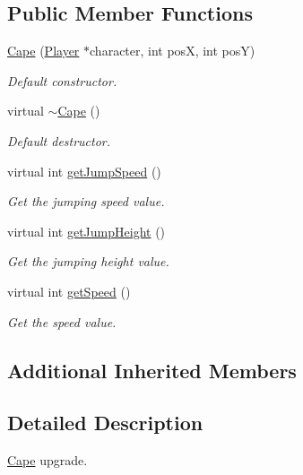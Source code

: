 \subsection*{Public Member Functions}
\begin{DoxyCompactItemize}
\item 
\hyperlink{class_cape_a457e670cb99edbb4590b619b56b04d62}{Cape} (\hyperlink{class_player}{Player} $\ast$character, int pos\-X, int pos\-Y)
\begin{DoxyCompactList}\small\item\em Default constructor. \end{DoxyCompactList}\item 
\hypertarget{class_cape_acd7ada8ed23427dc0ccecde8b400eef9}{virtual \hyperlink{class_cape_acd7ada8ed23427dc0ccecde8b400eef9}{$\sim$\-Cape} ()}\label{class_cape_acd7ada8ed23427dc0ccecde8b400eef9}

\begin{DoxyCompactList}\small\item\em Default destructor. \end{DoxyCompactList}\item 
virtual int \hyperlink{class_cape_a2b563a9b4bd336530dfe01585123a087}{get\-Jump\-Speed} ()
\begin{DoxyCompactList}\small\item\em Get the jumping speed value. \end{DoxyCompactList}\item 
virtual int \hyperlink{class_cape_ac2a629b66fc5b2678ebf294523b53799}{get\-Jump\-Height} ()
\begin{DoxyCompactList}\small\item\em Get the jumping height value. \end{DoxyCompactList}\item 
virtual int \hyperlink{class_cape_addd1a0fc11b71a36950cf8d9516b6869}{get\-Speed} ()
\begin{DoxyCompactList}\small\item\em Get the speed value. \end{DoxyCompactList}\end{DoxyCompactItemize}
\subsection*{Additional Inherited Members}


\subsection{Detailed Description}
\hyperlink{class_cape}{Cape} upgrade. 

